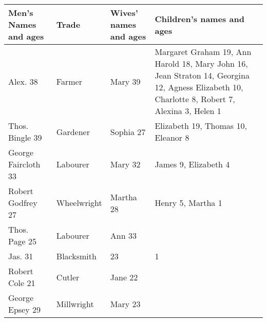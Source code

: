 \begin{table}[!ht]
  \centering
  \footnotesize
  \begin{tabular}{@{}p{3cm}p{1.5cm}p{2cm}p{5cm}@{}}
    \toprule
    Men's Names and ages        & Trade                        & Wives' names and ages & Children's names and ages                                                                                                                     \\

    \midrule
    Alex. \biggarASurname{} 38  & Farmer                       & Mary 39               & Margaret Graham 19, Ann Harold 18, Mary John 16, Jean Straton 14, Georgina 12, Agness Elizabeth 10, Charlotte 8, Robert 7, Alexina 3, Helen 1 \\
    Thos. Bingle 39             & Gardener                     & Sophia 27             & Elizabeth 19, Thomas 10, Eleanor 8                                                                                                            \\
    George Faircloth 33         & Labourer                     & Mary 32               & James 9, Elizabeth 4                                                                                                                          \\
    Robert Godfrey 27           & Wheelwright                  & Martha 28             & Henry 5, Martha 1                                                                                                                             \\
    Thos. Page 25               & Labourer                     & Ann 33                &                                                                                                                                               \\
    \rowcolor{yellow!30}
    Jas. \mcdonaldJSurname{} 31 & Blacksmith                   & \welchMNameOnly{} 23  & \mcdonaldANameOnly{} 1                                                                                                                        \\
    Robert Cole 21              & Cutler                       & Jane 22               &                                                                                                                                               \\
    George Epsey 29             & Millwright                   & Mary 23               &                                                                                                                                               \\

\end{tabular}
\end{table}

